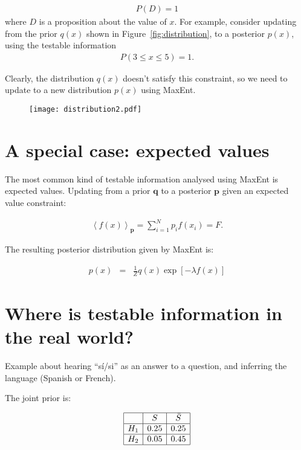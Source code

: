 \documentclass[a4paper, 11pt]{article}
\begin{document}
\begin{eqnarray}
P(D) = 1
\end{eqnarray}
where $D$ is a proposition about the value of $x$. For example, consider
updating from the prior $q(x)$ shown in Figure~\ref{fig:distribution}, to
a posterior $p(x)$, using the testable information
\begin{eqnarray}
P(3 \leq x \leq 5) = 1.
\end{eqnarray}

Clearly, the distribution $q(x)$ doesn't satisfy this constraint, so we
need to update to a new distribution $p(x)$ using MaxEnt.

\begin{figure}
\begin{center}
\texttt{[image: distribution2.pdf]}
\caption{\label{fig:distribution2}}
\end{center}
\end{figure}


\section{A special case: expected values}\label{sec:expectations}
The most common kind of testable information analysed using MaxEnt is
expected values. Updating from a prior $\boldsymbol{q}$ to a posterior
$\boldsymbol{p}$ given an expected value constraint:

\begin{eqnarray}
\left<f(x)\right>_{\boldsymbol{p}} = \sum_{i=1}^N p_i f(x_i) = F.
\end{eqnarray}

The resulting posterior distribution given by MaxEnt is:

\begin{eqnarray}
p(x) &=& \frac{1}{Z}q(x)\exp\left[-\lambda f(x)\right] 
\end{eqnarray}

\section{Where is testable information in the real world?}

Example about hearing ``sí/si'' as an answer to a question,
and inferring the language (Spanish or French).

The joint prior is:

\begin{eqnarray}
\begin{array}{|c|c|c|}
\hline
	&	S	& \bar{S}\\
\hline
H_1 & 0.25  & 0.25\\
\hline
H_2 & 0.05 & 0.45\\
\hline
\end{array}
\end{eqnarray}
\end{document}
